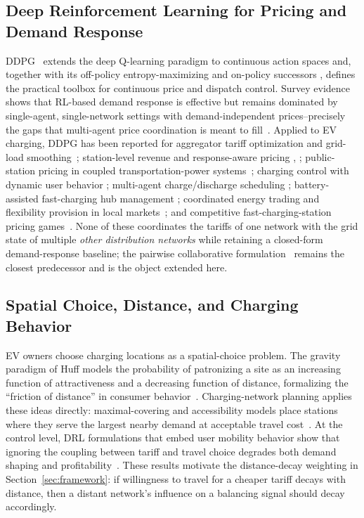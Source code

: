 \documentclass[10pt,journal]{IEEEtran}
\begin{document}
\subsection{Deep Reinforcement Learning for Pricing and Demand Response}
DDPG~\cite{lillicrap2016} extends the deep Q-learning paradigm
\cite{mnih2015} to continuous action spaces and, together with its
off-policy entropy-maximizing and on-policy successors
\cite{haarnoja2018,schulman2017}, defines the practical toolbox for
continuous price and dispatch control. Survey evidence shows that RL-based
demand response is effective but remains dominated by single-agent,
single-network settings with demand-independent prices--precisely the gaps
that multi-agent price coordination is meant to fill~\cite{vazquez2019}.
Applied to EV charging, DDPG has been reported for aggregator tariff
optimization and grid-load smoothing~\cite{qiu2020tia,liu2021access};
station-level revenue and response-aware pricing \cite{zhao2022tte},
\cite{lai2022tsg}; public-station pricing in coupled transportation-power
systems~\cite{cui2021tsg}; charging control with dynamic user behavior
\cite{yan2021tsg}; multi-agent charge/discharge scheduling
\cite{aljafari2023}; battery-assisted fast-charging hub management
\cite{paudel2023}; coordinated energy trading and flexibility provision in
local markets~\cite{ye2022}; and competitive fast-charging-station pricing
games~\cite{yang2024}. None of these coordinates the tariffs of one network
with the grid state of multiple \emph{other distribution networks} while
retaining a closed-form demand-response baseline; the pairwise
collaborative formulation~\cite{lepolesa2026} remains the closest
predecessor and is the object extended here.

\subsection{Spatial Choice, Distance, and Charging Behavior}
EV owners choose charging locations as a spatial-choice problem. The
gravity paradigm of Huff models the probability of patronizing a site as an
increasing function of attractiveness and a decreasing function of
distance, formalizing the ``friction of distance'' in
consumer behavior~\cite{huff1964}. Charging-network planning applies these
ideas directly: maximal-covering and accessibility models place stations
where they serve the largest nearby demand at acceptable travel
cost~\cite{frade2011}. At the control level, DRL formulations that embed
user mobility behavior show that ignoring the coupling between tariff and
travel choice degrades both demand shaping and
profitability~\cite{yan2021tsg}. These results motivate the distance-decay
weighting in Section~\ref{sec:framework}: if willingness to travel for a
cheaper tariff decays with distance, then a distant network's influence on a
balancing signal should decay accordingly.
\end{document}
